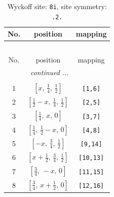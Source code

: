 \documentclass[fleqn,8pt]{jsarticle}
\begin{document}
\begin{longtable}{ccc}
\caption{Wyckoff site: {\tt 8i}, site symmetry: {\tt .2.}}
 \\
 \hline \hline
No. & position & mapping \\ \hline \endfirsthead

\multicolumn{2}{l}{\tablename\ \thetable{}} \\
 \hline \hline
No. & position & mapping \\ \hline \endhead

 \hline \hline
\multicolumn{2}{r}{\footnotesize\it continued ...} \\ \endfoot

 \hline \hline
\multicolumn{2}{r}{} \\ \endlastfoot

1 & $\left[ x,\, \frac{1}{4},\, \frac{1}{2} \right]$ & {\tt [1,6]} \\ \hline
2 & $\left[ \frac{1}{2} - x,\, \frac{1}{4},\, \frac{1}{2} \right]$ & {\tt [2,5]} \\ \hline
3 & $\left[ \frac{1}{4},\, x,\, 0 \right]$ & {\tt [3,7]} \\ \hline
4 & $\left[ \frac{1}{4},\, \frac{1}{2} - x,\, 0 \right]$ & {\tt [4,8]} \\ \hline
5 & $\left[ - x,\, \frac{3}{4},\, \frac{1}{2} \right]$ & {\tt [9,14]} \\ \hline
6 & $\left[ x + \frac{1}{2},\, \frac{3}{4},\, \frac{1}{2} \right]$ & {\tt [10,13]} \\ \hline
7 & $\left[ \frac{3}{4},\, - x,\, 0 \right]$ & {\tt [11,15]} \\ \hline
8 & $\left[ \frac{3}{4},\, x + \frac{1}{2},\, 0 \right]$ & {\tt [12,16]} \\
\end{longtable}
\renewcommand{\arraystretch}{1.2}
\end{document}
